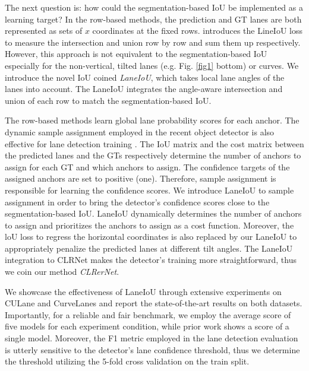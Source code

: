 \documentclass[10pt,twocolumn,letterpaper]{article}
\begin{document}
The next question is: how could the segmentation-based IoU be implemented as a learning target?
In the row-based methods, the prediction and GT lanes are both represented as sets of $x$ coordinates at the fixed rows. 
\cite{Zheng_2022_CVPR} introduces the LineIoU loss to measure the intersection and union row by row and sum them up respectively.
However, this approach is not equivalent to the segmentation-based IoU especially for the non-vertical, tilted lanes (e.g. Fig. \ref{fig1} bottom) or curves.
We introduce the novel IoU coined \textit{LaneIoU}, which takes local lane angles of the lanes into account.
The LaneIoU integrates the angle-aware intersection and union of each row to match the segmentation-based IoU.

The row-based methods learn global lane probability scores for each anchor.
The dynamic sample assignment employed in the recent object detector \cite{ota, YOLOX} is also effective for lane detection training \cite{Zheng_2022_CVPR}. The IoU matrix and the cost matrix between the predicted lanes and the GTs respectively determine the number of anchors to assign for each GT and which anchors to assign.
The confidence targets of the assigned anchors are set to positive (one). Therefore, sample assignment is responsible for learning the confidence scores.
We introduce LaneIoU to sample assignment in order to bring the detector's confidence scores close to the segmentation-based IoU.  LaneIoU dynamically determines the number of anchors to assign and prioritizes the anchors to assign as a cost function.
Moreover, the loU loss to regress the horizontal coordinates is also replaced by our LaneIoU to appropriately penalize the predicted lanes at different tilt angles.
The LaneIoU integration to CLRNet \cite{Zheng_2022_CVPR} makes the detector's training more straightforward, thus we coin our method \textit{CLRerNet}.

We showcase the effectiveness of LaneIoU through extensive experiments on CULane and CurveLanes and report the state-of-the-art results on both datasets.
Importantly, for a reliable and fair benchmark, we employ the average score of five models for each experiment condition, while prior work shows a score of a single model.
Moreover, the F1 metric employed in the lane detection evaluation is utterly sensitive to the detector's lane confidence threshold, thus we determine the threshold utilizing the 5-fold cross validation on the train split.
\end{document}
